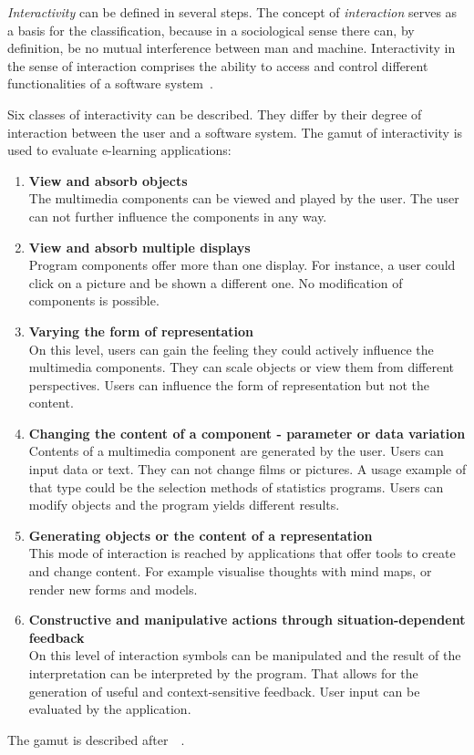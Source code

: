 \emph{Interactivity} can be defined in several steps. The concept of 
\emph{interaction} serves as a basis for the classification, because in a 
sociological sense there can, by definition, be no mutual interference
between man and machine. Interactivity in the sense of interaction comprises
the ability to access and control different functionalities of a software 
system~.

Six classes of interactivity can be described. They differ by their degree of
interaction between the user and a software system.
The gamut of interactivity is used to evaluate e-learning applications:
\begin{enumerate}
\item \textbf{View and absorb objects} \\
      The multimedia components can be viewed and played by the user.
      The user can not further influence the components in any way.
\item \textbf{View and absorb multiple displays} \\
      Program components offer more than one display. For instance, a user
      could click on a picture and be shown a different one.
      No modification of components is possible.
\item \textbf{Varying the form of representation} \\
      On this level, users can gain the feeling they could actively influence
      the multimedia components. They can scale objects or view them from
      different perspectives. Users can influence the form of representation
      but not the content.
\item \label{elearn:class:changingcontent}
      \textbf{Changing the content of a component - parameter or data 
      variation} \\
      Contents of a multimedia component are generated by the user. Users can
      input data or text. They can not change films or pictures.
      A usage example of that type could be the selection methods of statistics
      programs. Users can modify objects and the program yields different 
      results.
\item \label{elearn:class:generateobjects}
      \textbf{Generating objects or the content of a representation} \\
      This mode of interaction is reached by applications that offer tools to
      create and change content. For example visualise thoughts with mind maps,
      or render new forms and models.
\item \label{elearn:class:constructivemanipulative}
      \textbf{Constructive and manipulative actions through 
      situation-dependent feedback} \\
      On this level of interaction symbols can be manipulated and the result of
      the interpretation can be interpreted by the program.
      That allows for the generation of useful and context-sensitive feedback.
      User input can be evaluated by the application.
\end{enumerate}
The gamut is described after~~\citeyear{Richert2007}.

